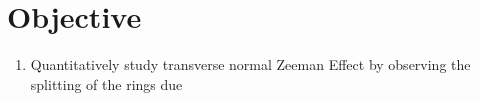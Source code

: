 \section{Objective}

\begin{enumerate}
    \item Quantitatively study transverse normal Zeeman Effect by observing the splitting of the rings due 
\end{enumerate}